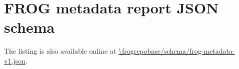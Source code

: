 \appendix

\chapter{FROG metadata report JSON schema}
\label{chap:schema}

The listing is also available online at \url{\frogrepobase/schema/frog-metadata-v1.json}.


